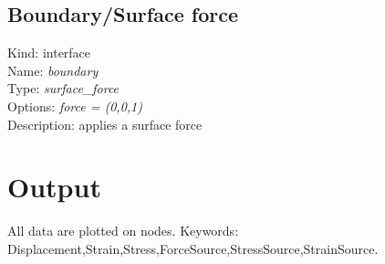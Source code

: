 \subsection{Boundary/Surface force}
Kind: interface \\
Name: \emph{boundary}\\
Type: \emph{surface\_force} \\
Options: \emph{force = (0,0,1)} \\
Description: applies a surface force

\section{Output}

All data are plotted on nodes. Keywords: Displacement,Strain,Stress,ForceSource,StressSource,StrainSource.




